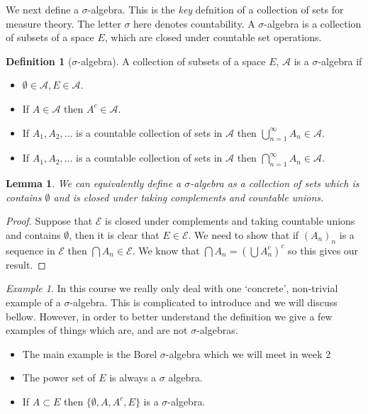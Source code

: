 \documentclass[11pt]{article}
\newtheorem{lem}[thm]{Lemma}
\theoremstyle{definition}
\newtheorem{dfn}[thm]{Definition}
\theoremstyle{remark}
\newtheorem{ex}[thm]{Example}
\begin{document}
We next define a $\sigma$-algebra. This is the \emph{key} defnition of a collection of sets for measure theory. The letter $\sigma$ here denotes countability. A $\sigma$-algebra is a collection of subsets of a space $E$, which are closed under countable set operations.
\begin{dfn}[$\sigma$-algebra]
A collection of subsets of a space $E$, $\mathcal{A}$ is a $\sigma$-algebra if
\begin{itemize}
\item $\emptyset \in \mathcal{A}, E \in \mathcal{A}$.
\item If $A \in \mathcal{A}$ then $A^c \in \mathcal{A}$.
\item If $A_1, A_2, \dots$ is a countable collection of sets in $\mathcal{A}$ then $ \bigcup_{n=1}^\infty A_n \in \mathcal{A}$.
\item If $A_1, A_2, \dots$ is a countable collection of sets in $\mathcal{A}$ then $\bigcap_{n=1}^\infty A_n \in \mathcal{A}$.
\end{itemize}
\end{dfn}
\begin{lem}
We can equivalently define a $\sigma$-algebra as a collection of sets which is contains $\emptyset$ and is closed under taking complements and countable unions.
\end{lem}
\begin{proof}
Suppose that $\mathcal{E}$ is closed under complements and taking countable unions and contains $\emptyset$, then it is clear that $E \in \mathcal{E}$. We need to show that if $(A_n)_n$ is a sequence in $\mathcal{E}$ then $\bigcap A_n \in \mathcal{E}$. We know that $\bigcap A_n = \left( \bigcup A_n^c \right)^c$ so this gives our result. 
\end{proof}


\begin{ex}
In this course we really only deal with one `concrete', non-trivial example of a $\sigma$-algebra. This is complicated to introduce and we will discuss bellow. However, in order to better understand the definition we give a few examples of things which are, and are not $\sigma$-algebras. 
\begin{itemize}
\item The main example is the Borel $\sigma$-algebra which we will meet in week 2
\item The power set of $E$ is always a $\sigma$ algebra.
\item If $A \subset E$ then $\{\emptyset, A, A^c, E\}$ is a $\sigma$-algebra.
\end{itemize}
\end{ex}
\end{document}
